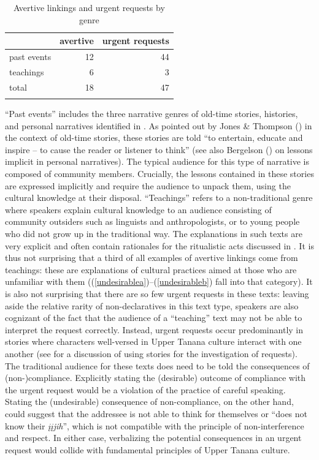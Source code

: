 \documentclass[output=paper,colorlinks,citecolor=brown
]{langscibook}
\begin{document}
\begin{table}
\caption{Avertive linkings and urgent requests by genre}
\label{tab:avertive-freq2}
 \begin{tabular}{l rr } 
  \lsptoprule
      & avertive & urgent requests  \\   \midrule
past events & 12 & 44 \\
teachings & 6 & 3 \\\midrule
total & 18 & 47\\ 
  \lspbottomrule
 \end{tabular}
\end{table} 

``Past events'' includes the three narrative genres of old-time stories, histories, and personal narratives identified in \citet{LovickO2012b-genre}.  As pointed out by Jones \& Thompson (\citeyear[ix]{JonesEThompsonC1990}) in the context of old-time stories, these stories are told ``to entertain, educate and inspire -- to cause the reader or listener to think'' (see also Bergelson (\citeyear{BergelsonM2019}) on lessons implicit in personal narratives). The typical audience for this type of narrative is composed of community members. Crucially, the lessons contained in these stories are expressed implicitly and require the audience to unpack them, using the cultural knowledge at their disposal. ``Teachings'' refers to a non-traditional genre where speakers explain cultural knowledge to an audience consisting of community outsiders such as linguists and anthropologists, or to young people who did not grow up in the traditional way. The explanations in such texts are very explicit and often contain rationales for the ritualistic acts discussed in . It is thus not surprising that a third of all examples of avertive linkings come from teachings: these are explanations of cultural practices aimed at those who are unfamiliar with them ((\ref{undesirablea})--(\ref{undesirableb}) fall into that category). It is also not surprising that there are so few urgent requests in these texts: leaving aside the relative rarity of non-declaratives in this text type, speakers are also cognizant of the fact that the audience of a ``teaching'' text may not be able to interpret the request correctly. Instead, urgent requests occur predominantly in stories where characters well-versed in Upper Tanana culture interact with one another (see \citet{LovickO2016} for a discussion of using stories for the investigation of requests). The traditional audience for these texts does need to be told the consequences of (non-)compliance. Explicitly stating the (desirable) outcome of compliance with the urgent request would be a violation of the practice of careful speaking. Stating the (undesirable) consequence of non-compliance, on the other hand, could suggest that the addressee is not able to think for themselves or ``does not know their \textit{įįjih}'', which is not compatible with the principle of non-interference and respect. In either case, verbalizing the potential consequences in an urgent request would collide with fundamental principles of Upper Tanana culture.
\end{document}
